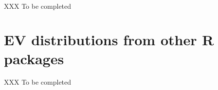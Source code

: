\documentclass[11pt]{article}\usepackage[]{graphicx}\usepackage[]{xcolor}
\begin{document}
XXX To be completed





\section{EV distributions from other R packages}

XXX To be completed
\end{document}

